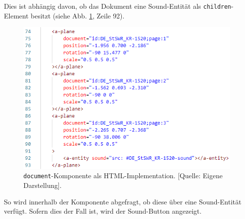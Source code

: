 \documentclass[a4paper,12pt,oneside]{article}
\begin{document}
        Dies ist abhängig davon, ob das
        Dokument eine Sound-Entität als \texttt{children}-Element besitzt
        (siehe Abb. \ref{fig:document1}, Zeile 92).
        \begin{figure}
          \centering
          \includegraphics{img/coding/document1.png}
          \caption[\texttt{document}-Komponente als HTML-Implementation.]{\texttt{document}-Komponente als HTML-Implementation. [Quelle: Eigene Darstellung].}
          \label{fig:document1}
        \end{figure}
        So wird innerhalb der Komponente abgefragt, ob diese über 
        eine Sound-Entität verfügt. Sofern dies der Fall ist, 
        wird der Sound-Button angezeigt. \newpage
\end{document}

